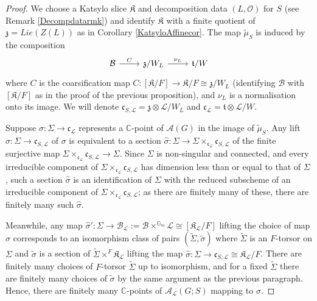 \documentclass{amsart}
\theoremstyle{remark}
\numberwithin{theorem}{section}
\numberwithin{equation}{section}
\begin{document}
\begin{proof}
We choose a Katsylo slice $\mathfrak{K}$ and decomposition data $(L,\mathcal O)$ for $S$ (see Remark \ref{Decompdatarmk}) and identify $\mathfrak{K}$ with a finite quotient of $\mathfrak{z} = Lie(Z(L))$ as in Corollary \ref{KatsyloAffinecor}. The map $\tilde{\mu}_S$ is induced by the composition
\begin{equation}\label{SHitchinBaseNormeqn}
\begin{tikzcd}
\mathcal B \arrow[r, "C"] & \mathfrak{z}/W_L \arrow[r, "\nu_L"] & \mathfrak{t}/W
\end{tikzcd}
\end{equation}
where $C$ is the coarsification map $C:[\mathfrak{K}/F] \rightarrow \mathfrak{K}/F \cong \mathfrak{z}/W_L$ (identifying $\mathcal B$ with $[\mathfrak{K}/F]$ as in the proof of the previous proposition), and $\nu_L$ is a normalisation onto its image. We will denote $\mathfrak{c}_{S,\mathcal L} = \mathfrak{z} \otimes\mathcal L/W_L$ and $\mathfrak{c}_\mathcal L = \mathfrak{t} \otimes \mathcal L/W$.

Suppose $\sigma:\Sigma \rightarrow \mathfrak{c}_\mathcal L$ represents a $\mathbb{C}$-point of $\mathcal A(G)$ in the image of $\tilde{\mu}_S$. Any lift $\hat{\sigma}:\Sigma \rightarrow \mathfrak{c}_{S,\mathcal L}$ of $\sigma$ is equivalent to a section $\hat{\sigma}:\Sigma \rightarrow \Sigma \times_{\mathfrak{c}_\mathcal L}\mathfrak{c}_{S,\mathcal L}$ of the finite surjective map $\Sigma \times_{\mathfrak{c}_\mathcal L}\mathfrak{c}_{S,\mathcal L} \rightarrow \Sigma$. Since $\Sigma$ is non-singular and connected, and every irreducible component of $\Sigma \times_{\mathfrak{c}_\mathcal L}\mathfrak{c}_{S,\mathcal L}$ has dimension less than or equal to that of $\Sigma$, such a section $\hat{\sigma}$ is an identification of $\Sigma$ with the reduced subscheme of an irreducible component of $\Sigma \times_{\mathfrak{c}_\mathcal L}\mathfrak{c}_{S,\mathcal L}$; as there are finitely many of these, there are finitely many such $\hat{\sigma}$.

Meanwhile, any map $\hat{\sigma}':\Sigma \rightarrow \mathcal B_\mathcal L:=\mathcal B \times^{\mathbb{G}_m}\mathcal L \cong [\mathfrak{K}_\mathcal L/F]$ lifting the choice of map $\hat{\sigma}$ corresponds to an isomorphism class of pairs $(\tilde{\Sigma},\tilde{\sigma})$ where $\tilde{\Sigma}$ is an $F$-torsor on $\Sigma$ and $\tilde{\sigma}$ is a section of $\tilde{\Sigma} \times^F\mathfrak{K}_\mathcal L$ lifting the map $\hat{\sigma}:\Sigma \rightarrow \mathfrak{c}_{S,\mathcal L} \cong  \mathfrak{K}_\mathcal L/F$. There are finitely many choices of $F$-torsor $\tilde{\Sigma}$ up to isomorphism, and for a fixed $\tilde{\Sigma}$ there are finitely many choices of $\tilde{\sigma}$ by the same argument as the previous paragraph. Hence, there are finitely many $\mathbb{C}$-points of $\mathcal A_\mathcal L(G;S)$ mapping to $\sigma$.


\end{proof}
\end{document}
